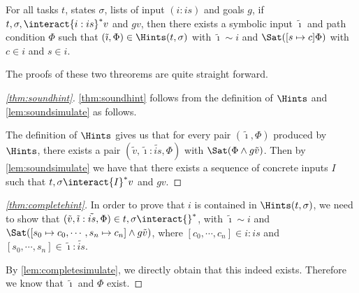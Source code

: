 \begin{theorem}
  \label{thm:completehint}
  For all tasks $t$, states $\sigma$, lists of input $(i:is)$ and goals $g$,
  if $t,\sigma,\interact{i:is}^*v$ and $g v$, then there exists a symbolic input $\tilde{\imath}$ and path condition $\Phi$
  such that $(\tilde{\imath},\Phi)\in\Hints(t,\sigma)$ with $\tilde{\imath}\sim i$ and $\Sat([s\mapsto c]\Phi)$ with $c\in i$ and $s\in i$.
\end{theorem}


The proofs of these two threorems are quite straight forward.

\begin{proof}[\cref{thm:soundhint}]
  \cref{thm:soundhint} follows from the definition of $\Hints$ and \cref{lem:soundsimulate} as follows.

  The definition of $\Hints$ gives us that for every pair $(\tilde{\imath},\Phi)$ produced by $\Hints$,
  there exists a pair $(\tilde{v},\tilde{\imath}:\tilde{is},\Phi)$ with $\Sat(\Phi\land g \tilde{v})$.
  Then by \cref{lem:soundsimulate} we have that there exists a sequence of concrete inputs $I$ such that
  $t,\sigma\interact{I}^*v$ and $g v$.
\end{proof}


\begin{proof}[\cref{thm:completehint}]
  In order to prove that $i$ is contained in $\Hints(t,\sigma)$, we need to show that $(\tilde{v},\tilde{\imath}:\tilde{is},\Phi)\in t,\sigma\interact{}^*$, with $\tilde{\imath}\sim i$ and $\Sat([s_0\mapsto c_0,\cdots,s_n\mapsto c_n]\land g\tilde{v})$, where $[c_0,\cdots,c_n]\in i:is$ and $[s_0,\cdots,s_n]\in \tilde{\imath}:\tilde{is}$.

  By \cref{lem:completesimulate}, we directly obtain that this indeed exists. Therefore we know that $\tilde{\imath}$ and $\Phi$ exist.
\end{proof}
